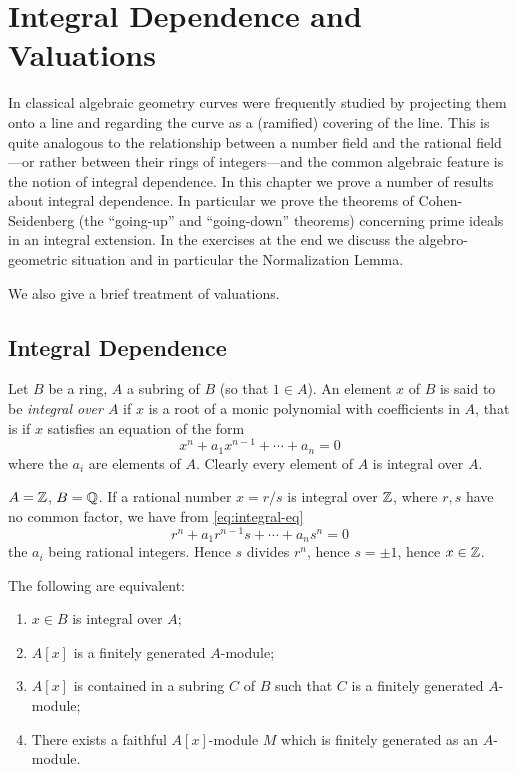 \chapter{Integral Dependence and Valuations}\label{chapter5}

In classical algebraic geometry curves were frequently studied by projecting them onto a line and regarding the curve as a (ramified) covering of the line. This is quite analogous to the relationship between a number field and the rational field---or rather between their rings of integers---and the common algebraic feature is the notion of integral dependence. In this chapter we prove a number of results about integral dependence. In particular we prove the theorems of Cohen-Seidenberg (the ``going-up'' and ``going-down'' theorems) concerning prime ideals in an integral extension. In the exercises at the end we discuss the algebro-geometric situation and in particular the Normalization Lemma.

We also give a brief treatment of valuations.

\section*{Integral Dependence}
Let $B$ be a ring, $A$ a subring of $B$ (so that $1 \in A$). An element $x$ of $B$ is said to be \emph{integral over $A$} if $x$ is a root of a monic polynomial with coefficients in $A$, that is if $x$ satisfies an equation of the form
\begin{equation}\label{eq:integral-eq}
x^n + a_1 x^{n-1} + \cdots + a_n = 0 \tag{1}
\end{equation}
where the $a_i$ are elements of $A$. Clearly every element of $A$ is integral over $A$.

\setcounter{theorem}{-1}
\begin{examplenumbered}\label{ex:5.0}
$A = \mathbb{Z}$, $B = \mathbb{Q}$. If a rational number $x = r/s$ is integral over $\mathbb{Z}$, where $r, s$ have no common factor, we have from \eqref{eq:integral-eq}
\[
r^n + a_1 r^{n-1} s + \cdots + a_n s^n = 0
\]
the $a_i$ being rational integers. Hence $s$ divides $r^n$, hence $s = \pm 1$, hence $x \in \mathbb{Z}$.
\end{examplenumbered}

\begin{proposition}\label{prop:5.1}
The following are equivalent:
\begin{enumerate}
    \item[i)] $x \in B$ is integral over $A$;
    \item[ii)] $A[x]$ is a finitely generated $A$-module;
    \item[iii)] $A[x]$ is contained in a subring $C$ of $B$ such that $C$ is a finitely generated $A$-module;
    \item[iv)] There exists a faithful $A[x]$-module $M$ which is finitely generated as an $A$-module.
\end{enumerate}
\end{proposition}

